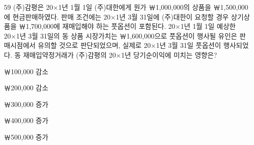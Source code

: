 \begin{question}{59}
(주)감평은 20×1년 1월 1일 (주)대한에게 원가 ￦1,000,000의 상품을 ￦1,500,000에 현금판매하였다. 판매 조건에는 20×1년 3월 31일에 (주)대한이 요청할 경우 상기상품을 ￦1,700,000에 재매입해야 하는 풋옵션이 포함된다. 20×1년 1월 1일 예상한 20×1년 3월 31일의 동 상품 시장가치는 ￦1,600,000으로 풋옵션이 행사될 유인은 판매시점에서 유의할 것으로 판단되었으며, 실제로 20×1년 3월 31일 풋옵션이 행사되었다. 동 재매입약정거래가 (주)감평의 20×1년 당기순이익에 미치는 영향은?
\begin{choices}
  \item ￦100,000 감소
  \item ￦200,000 감소
  \item ￦300,000 증가
  \item ￦400,000 증가
  \item ￦500,000 증가
\end{choices}
\end{question}
